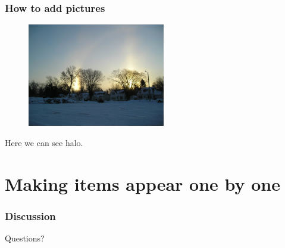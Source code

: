\documentclass{beamer}
\begin{document}
\begin{frame}
  \frametitle{How to add pictures}
\begin{figure}
\includegraphics[height=45mm]{halo.jpg}
\end{figure}

Here we can see halo. 
\end{frame}

\section{Making items appear one by one}


\begin{frame}
  \frametitle{Discussion}
Questions?
\end{frame}
\end{document}
